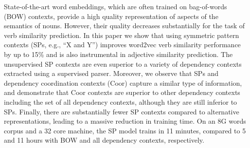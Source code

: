 State-of-the-art word embeddings, which are often trained on bag-of-words (BOW) contexts, provide a high quality representation of aspects of the semantics of nouns. However, their quality decreases substantially for the task of verb similarity prediction. In this paper we show that using symmetric pattern contexts (SPs, e.g., ``X and Y'') improves word2vec verb similarity performance by up to 15\% and is also instrumental in adjective similarity prediction. The unsupervised SP contexts are even superior to a variety of dependency contexts extracted using a supervised parser. Moreover, we observe that SPs and dependency coordination contexts (Coor) capture a similar type of information, and demonstrate that Coor contexts are superior to other dependency contexts including the set of all dependency contexts, although they are still inferior to SPs. Finally, there are substantially fewer SP contexts compared to alternative representations, leading to a massive reduction in training time. On an 8G words corpus and a 32 core machine, the SP model trains in 11 minutes, compared to 5 and 11 hours with BOW and all dependency contexts, respectively.
